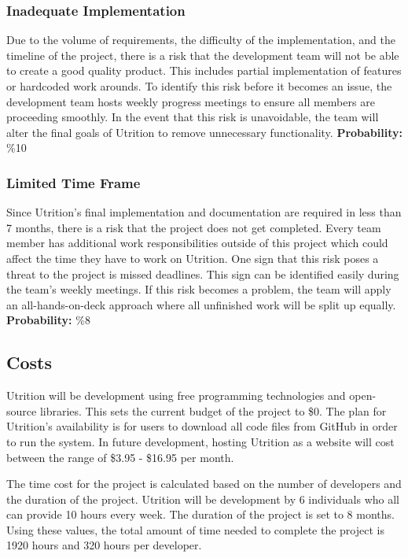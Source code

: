 \documentclass[12pt]{article}
\begin{document}
\subsubsection{Inadequate Implementation}
Due to the volume of requirements, the difficulty of the implementation, and the timeline of the project, there is a risk that the development team will not be able to create a good quality product. This includes partial implementation of features or hardcoded work arounds. To identify this risk before it becomes an issue, the development team hosts weekly progress meetings to ensure all members are proceeding smoothly. In the event that this risk is unavoidable, the team will alter the final goals of Utrition to remove unnecessary functionality.\newline
\textbf{Probability:} \%10

\subsubsection{Limited Time Frame}
Since Utrition's final implementation and documentation are required in less than 7 months, there is a risk that the project does not get completed. Every team member has additional work responsibilities outside of this project which could affect the time they have to work on Utrition. One sign that this risk poses a threat to the project is missed deadlines. This sign can be identified easily during the team's weekly meetings. If this risk becomes a problem, the team will apply an all-hands-on-deck approach where all unfinished work will be split up equally.\newline
\textbf{Probability:} \%8

\subsection{Costs}
Utrition will be development using free programming technologies and open-source libraries. This sets the current budget of the project to \$0. The plan for Utrition's availability is for users to download all code files from GitHub in order to run the system. In future development, hosting Utrition as a website will cost between the range of \$3.95 - \$16.95 per month.

The time cost for the project is calculated based on the number of developers and the duration of the project. Utrition will be development by 6 individuals who all can provide 10 hours every week. The duration of the project is set to 8 months. Using these values, the total amount of time needed to complete the project is 1920 hours and 320 hours per developer.
\end{document}
